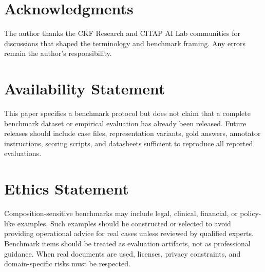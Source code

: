 \documentclass[11pt]{article}
\begin{document}
\section*{Acknowledgments}

The author thanks the CKF Research and CITAP AI Lab communities for discussions that shaped the terminology and benchmark framing. Any errors remain the author's responsibility.

\section*{Availability Statement}

This paper specifies a benchmark protocol but does not claim that a complete benchmark dataset or empirical evaluation has already been released. Future releases should include case files, representation variants, gold answers, annotator instructions, scoring scripts, and datasheets sufficient to reproduce all reported evaluations.

\section*{Ethics Statement}

Composition-sensitive benchmarks may include legal, clinical, financial, or policy-like examples. Such examples should be constructed or selected to avoid providing operational advice for real cases unless reviewed by qualified experts. Benchmark items should be treated as evaluation artifacts, not as professional guidance. When real documents are used, licenses, privacy constraints, and domain-specific risks must be respected.
\end{document}
